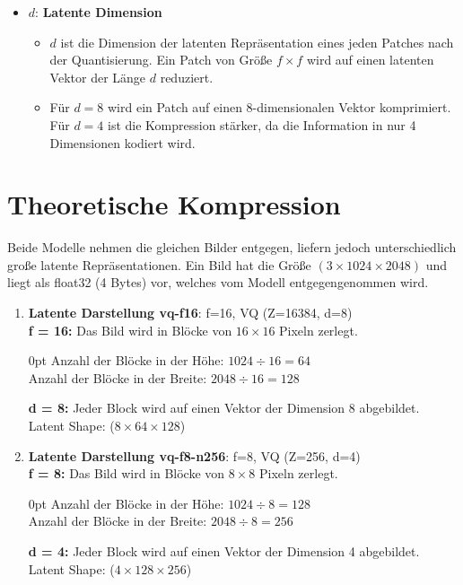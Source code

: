     \begin{itemize} \item \( d \): \textbf{Latente Dimension}
        \begin{itemize}
            \item \( d \) ist die Dimension der latenten Repräsentation eines jeden Patches nach der Quantisierung. Ein Patch von Größe $f \times f$ wird auf einen latenten Vektor der Länge $d$ reduziert.
            \item Für $d=8$ wird ein Patch auf einen 8-dimensionalen Vektor komprimiert.\\
            Für $d=4$ ist die Kompression stärker, da die Information in nur 4 Dimensionen kodiert wird.
        \end{itemize}
    \end{itemize}

\newpage
    \section{Theoretische Kompression}
        \cite{rombach2021highresolution, https://doi.org/10.48550/arxiv.2204.11824} Beide Modelle nehmen die gleichen Bilder entgegen, liefern jedoch unterschiedlich große latente Repräsentationen. Ein Bild hat die Größe $(3 \times 1024 \times 2048)$ und liegt als float32 (4 Bytes) vor, welches vom Modell entgegengenommen wird.
        
        \begin{enumerate}
        \item \textbf{Latente Darstellung vq-f16}: f=16, VQ (Z=16384, d=8)\\
            \textbf{f = 16:} Das Bild wird in Blöcke von $16 \times 16$ Pixeln zerlegt.
            \begin{addmargin}[45pt]{0pt}
            Anzahl der Blöcke in der Höhe: $1024 \div 16 = 64$\\
            Anzahl der Blöcke in der Breite: $2048 \div 16 = 128$
            \end{addmargin}
            \textbf{d = 8:} Jeder Block wird auf einen Vektor der Dimension 8 abgebildet.\\
            Latent Shape: ($8 \times 64 \times 128$)
        \item \textbf{Latente Darstellung vq-f8-n256}: f=8, VQ (Z=256, d=4)\\
            \textbf{f = 8:} Das Bild wird in Blöcke von $8 \times 8$ Pixeln zerlegt.
            \begin{addmargin}[45pt]{0pt}
            Anzahl der Blöcke in der Höhe: $1024 \div 8 = 128$\\
            Anzahl der Blöcke in der Breite: $2048 \div 8 = 256$
            \end{addmargin}
            \textbf{d = 4:} Jeder Block wird auf einen Vektor der Dimension 4 abgebildet.\\
            Latent Shape: ($4 \times 128 \times 256$)
        \end{enumerate}
    
